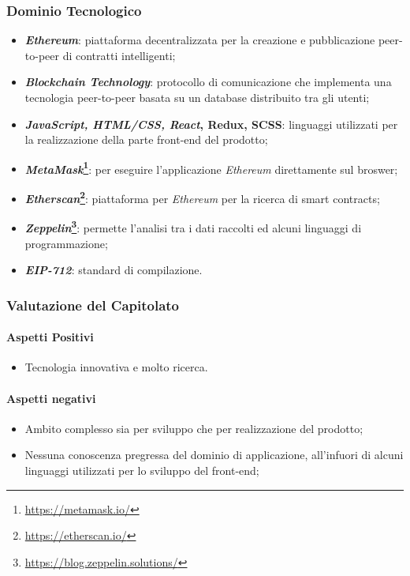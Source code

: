 \subsubsection{Dominio Tecnologico}

\begin{itemize}
  \item \textbf{\textit{Ethereum}\glossario}: piattaforma decentralizzata per la creazione e pubblicazione peer-to-peer di contratti intelligenti;
  \item \textbf{\textit{Blockchain Technology}\glossario}: protocollo di comunicazione che implementa una tecnologia peer-to-peer basata su un database distribuito tra gli utenti;
  \item \textbf{\textit{JavaScript, HTML/CSS, React}\glossario, Redux\glossario, SCSS\glossario}: linguaggi utilizzati per la realizzazione della parte front-end del prodotto;
  \item \textbf{\textit{MetaMask}\footnote{\url{https://metamask.io/}}\glossario}: per eseguire l'applicazione \textit{Ethereum} direttamente sul broswer;
  \item \textbf{\textit{Etherscan}\footnote{\url{https://etherscan.io/}}\glossario}: piattaforma per \textit{Ethereum} per la ricerca di smart contracts;
  \item \textbf{\textit{Zeppelin}\footnote{\url{https://blog.zeppelin.solutions/}}\glossario}: permette l'analisi tra i dati raccolti ed alcuni linguaggi di programmazione;
  \item \textbf{\textit{EIP-712}}: standard di compilazione.
\end{itemize}

\subsubsection{Valutazione del Capitolato}
\paragraph{Aspetti Positivi}
\begin{itemize}
  \item Tecnologia innovativa e molto ricerca.
\end{itemize}

\paragraph{Aspetti negativi}
\begin{itemize}
  \item Ambito complesso sia per sviluppo che per realizzazione del prodotto;
  \item Nessuna conoscenza pregressa del dominio di applicazione, all'infuori di alcuni linguaggi utilizzati per lo sviluppo del front-end;
\end{itemize}

